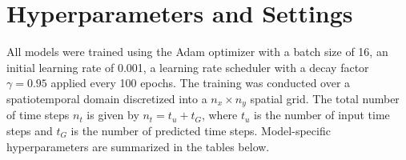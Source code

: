 \section{Hyperparameters and Settings}
\renewcommand{\thefigure}{H.\arabic{figure}}  %
\renewcommand{\thetable}{H.\arabic{table}}  %

All models were trained using the Adam optimizer with a batch size of 16, an initial learning rate of 0.001, a learning rate scheduler with a decay factor $\gamma = 0.95$ applied every 100 epochs. The training was conducted over a spatiotemporal domain discretized into a $n_x \times n_y$ spatial grid. The total number of time steps $n_t$ is given by $n_t = t_u + t_G$, where $t_u$ is the number of input time steps and $t_G$ is the number of predicted time steps. Model-specific hyperparameters are summarized in the tables below.


